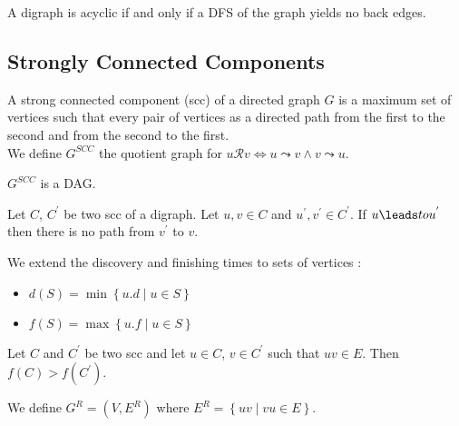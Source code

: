 \documentclass{cours}
\begin{document}
        \begin{lemma}
            A digraph is acyclic if and only if a DFS of the graph yields no back edges.
        \end{lemma}

        \subsection{Strongly Connected Components}
        \begin{definition}
            A strong connected component (scc) of a directed graph $G$ is a maximum set of vertices such that every pair of vertices as a directed path from the first to the second and from the second to the first. \\ We define $G^{SCC}$ the quotient graph for $u \mathcal{R} v \Leftrightarrow u \leadsto v \wedge v \leadsto u$.
        \end{definition}
        
        \begin{proposition}
            $G^{SCC}$ is a DAG.
        \end{proposition}

        \begin{lemma}
            Let $C$, $C^{'}$ be two scc of a digraph. Let $u, v \in C$ and $u^{'}, v^{'} \in C^{'}$. If $u \leads to u^{'}$ then there is no path from $v^{'}$ to $v$.
        \end{lemma}

        \begin{definition}
            We extend the discovery and finishing times to sets of vertices : 
            \begin{itemize}
                \item $d(S) = \min \left\{u.d \mid u \in S\right\}$
                \item $f(S) = \max \left\{u.f \mid u \in S \right\}$
            \end{itemize}
        \end{definition}

        \begin{lemma}
            Let $C$ and $C^{'}$ be two scc and let $u \in C$, $v \in C^{'}$ such that $uv \in E$. Then $f(C) > f(C^{'})$.
        \end{lemma}

        \begin{definition}
            We define $G^{R} = \left(V, E^{R}\right)$ where $E^{R} = \left\{uv \mid vu \in E\right\}$.
        \end{definition}
\end{document}
